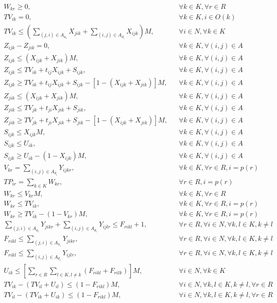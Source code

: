 \documentclass[10pt]{article}
\begin{document}
\[\begin{aligned}
& W_{kr} \geq 0, && \forall k \in K, \forall r \in R \\
& TV_{ik} = 0, && \forall k \in K, i \in O(k) \\
& TV_{ik} \leq \left( \sum_{(j,i) \in A_{u_i}} X_{jik} + \sum_{(i,j) \in A_{d_i}} X_{ijk} \right) M, && \forall i \in N, \forall k \in K \\
& Z_{ijk} - Z_{jik} = 0, && \forall k \in K, \forall (i, j) \in A \\
& Z_{ijk} \leq (X_{ijk} + X_{jik}) M, && \forall k \in K, \forall (i, j) \in A \\
& Z_{ijk} \leq TV_{ik} + t_{ij}X_{ijk} + S_{ijk}, && \forall k \in K, \forall (i, j) \in A \\
& Z_{ijk} \geq TV_{ik} + t_{ij}X_{ijk} + S_{ijk} - \left[ 1 - (X_{ijk} + X_{jik}) \right] M, && \forall k \in K, \forall (i, j) \in A \\
& Z_{jik} \leq (X_{ijk} + X_{jik}) M, && \forall k \in K, \forall (i, j) \in A \\
& Z_{jik} \leq TV_{jk} + t_{ji}X_{jik} + S_{jik}, && \forall k \in K, \forall (i, j) \in A \\
& Z_{jik} \geq TV_{jk} + t_{ji}X_{jik} + S_{jik} - \left[ 1 - (X_{ijk} + X_{jik}) \right] M, && \forall k \in K, \forall (i, j) \in A \\
& S_{ijk} \leq X_{ijk} M, && \forall k \in K, \forall (i, j) \in A \\
& S_{ijk} \leq U_{ik}, && \forall k \in K, \forall (i, j) \in A \\
& S_{ijk} \geq U_{ik} - (1 - X_{ijk}) M, && \forall k \in K, \forall (i, j) \in A \\
& V_{kr} = \sum_{(i,j) \in A_{d_i}} Y_{ijkr}, && \forall k \in K, \forall r \in R, i = p(r) \\
& TP_{ir} = \sum_{k \in K} W_{kr}, && \forall r \in R, i = p(r) \\
& W_{kr} \leq V_{kr} M, && \forall k \in K, \forall r \in R \\
& W_{kr} \leq TV_{ik}, && \forall k \in K, \forall r \in R, i = p(r) \\
& W_{kr} \geq TV_{ik} - (1 - V_{kr}) M, && \forall k \in K, \forall r \in R, i = p(r) \\
& \sum_{(j,i) \in A_{u_i}} Y_{jikr} + \sum_{(i,j) \in A_{d_i}} Y_{ijlr} \leq F_{rikl} + 1, && \forall r \in R, \forall i \in N, \forall k, l \in K, k \neq l \\
& F_{rikl} \leq \sum_{(j,i) \in A_{u_i}} Y_{jikr}, && \forall r \in R, \forall i \in N, \forall k, l \in K, k \neq l \\
& F_{rikl} \leq \sum_{(i,j) \in A_{d_i}} Y_{ijlr}, && \forall r \in R, \forall i \in N, \forall k, l \in K, k \neq l \\
& U_{ik} \leq \left[ \sum_{r \in R} \sum_{l \in K, l \neq k} (F_{rikl} + F_{rilk}) \right] M, && \forall i \in N, \forall k \in K \\
& TV_{ik} - (TV_{il} + U_{il}) \leq (1 - F_{rikl}) M, && \forall i \in N, \forall k, l \in K, k \neq l, \forall r \in R \\
& TV_{il} - (TV_{ik} + U_{ik}) \leq (1 - F_{rikl}) M, && \forall i \in N, \forall k, l \in K, k \neq l, \forall r \in R
\end{aligned}
\]
\end{document}
